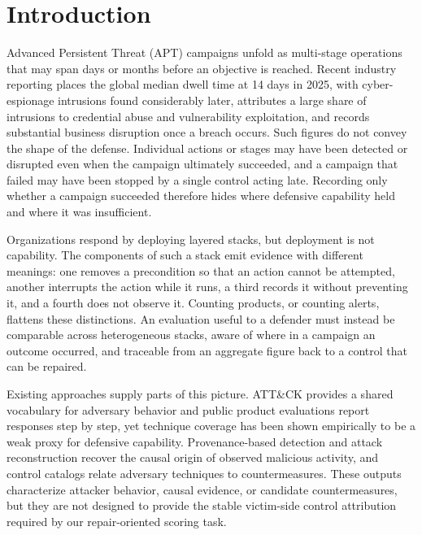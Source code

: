 \section{Introduction}

Advanced Persistent Threat (APT) campaigns unfold as multi-stage operations that may span
days or months before an objective is reached. Recent industry reporting places the global
median dwell time at 14 days in 2025, with cyber-espionage intrusions found considerably
later\cite{mandiant2026mtrends}, attributes a large share of intrusions to credential abuse
and vulnerability exploitation\cite{verizon2025dbir}, and records substantial business
disruption once a breach occurs\cite{ibm2024costdatabreach}. Such figures do not convey the
shape of the defense. Individual actions or stages may have been detected or disrupted even
when the campaign ultimately succeeded, and a campaign that failed may have been stopped by a
single control acting late. Recording only whether a campaign succeeded therefore hides where
defensive capability held and where it was insufficient.

Organizations respond by deploying layered stacks, but deployment is not capability. The
components of such a stack emit evidence with different meanings: one removes a precondition
so that an action cannot be attempted, another interrupts the action while it runs, a third
records it without preventing it, and a fourth does not observe it. Counting products, or
counting alerts, flattens these distinctions. An evaluation useful to a defender must instead
be comparable across heterogeneous stacks, aware of where in a campaign an outcome occurred,
and traceable from an aggregate figure back to a control that can be repaired.

Existing approaches supply parts of this picture. ATT\&CK provides a shared vocabulary for
adversary behavior\cite{mitreAttack} and public product evaluations report responses step by
step\cite{mitreAttackEvaluations}, yet technique coverage has been shown empirically to be a
weak proxy for defensive capability\cite{virkud2024endpoint}. Provenance-based detection and
attack reconstruction recover the causal origin of observed malicious
activity\cite{jiang2025orthrus,goyal2024rcaid}, and control catalogs relate adversary
techniques to countermeasures\cite{mitreCTIDMappings,kaloroumakis2021d3fend}. These outputs
characterize attacker behavior, causal evidence, or candidate countermeasures, but they are
not designed to provide the stable victim-side control attribution required by our
repair-oriented scoring task.


